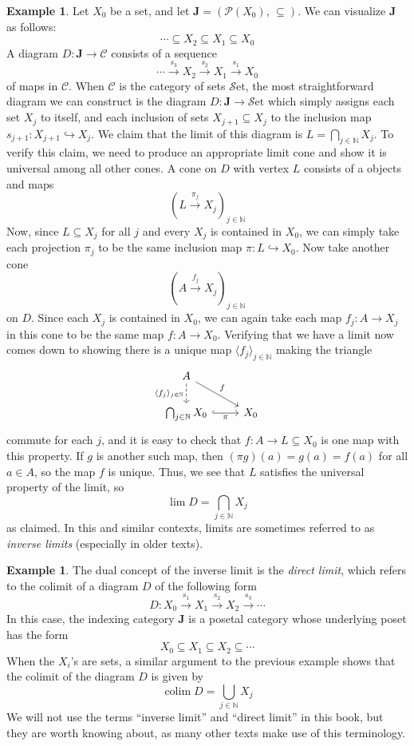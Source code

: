 \documentclass[10pt,oneside]{book}
\def\~#1{\mathscr{#1}}
\def\To#1{\xrightarrow{#1}}
\newcommand{\N}{\mathbb{N}}
\newcommand{\colim}{\mathop{\mathrm{colim}}}
\newcommand{\mono}{\hookrightarrow}
\newcommand{\Set}{\~S\mathrm{et}}
\theoremstyle{plain}
\theoremstyle{definition}
\newtheorem{ex}[thm]{Example}
\theoremstyle{remark}
\numberwithin{equation}{section}
\numberwithin{figure}{section}
\begin{document}
\begin{ex}
Let $X_0$ be a set, and let $\mathbf{J} = \left( \~P(X_0), \, \subseteq \right)$. We can visualize $\mathbf{J}$ as follows:
\[
\cdots \subseteq X_2 \subseteq X_1 \subseteq X_0
\]
A diagram $D: \mathbf{J} \to \~C$ consists of a sequence
\[\cdots \To{s_3} X_2 \To{s_2} X_1 \To{s_1} X_0\] 
of maps in $\~C$. When $\~C$ is the category of sets $\Set$, the most straightforward diagram we can construct is the diagram $D: \mathbf{J} \to \Set$ which simply assigns each set $X_j$ to itself, and each inclusion of sets $X_{j + 1} \subseteq X_{j}$ to the inclusion map $s_{j + 1}: X_{j + 1} \mono X_{j}$. We claim that the limit of this diagram is $L = \bigcap_{j \in \N} X_j$. To verify this claim, we need to produce an appropriate limit cone and show it is universal among all other cones. A cone on $D$ with vertex $L$ consists of a objects and maps 
\[\left(L \To{\pi_j} X_j\right)_{j \in \N}\]
Now, since $L\subseteq X_j$ for all $j$ and every $X_j$ is contained in $X_0$, we can simply take each projection $\pi_j$ to be the same inclusion map $\pi: L \mono X_0$. Now take another cone
\[\left(A \To{f_j} X_j \right)_{j \in \N}\] 
on $D$. Since each $X_j$ is contained in $X_0$, we can again take each map $f_j: A \to X_j$ in this cone to be the same map $f: A \to X_0$. Verifying that we have a limit now comes down to showing there is a unique map $\langle f_j \rangle_{j \in \N}$ making the triangle 
\[\begin{tikzcd}
    A \\
    {\bigcap_{j \in \N}X_0} & {X_0}
    \arrow["{\langle f_j \rangle_{j \in \N}}"', dashed, from=1-1, to=2-1]
    \arrow["\pi"', hook, from=2-1, to=2-2]
    \arrow["f", from=1-1, to=2-2]
\end{tikzcd}\]
commute for each $j$, and it is easy to check that $f: A \to L \subseteq X_0$ is one map with this property. If $g$ is another such map, then $(\pi g) (a) = g(a) = f(a)$ for all $a \in A$, so the map $f$ is unique. Thus, we see that $L$ satisfies the universal property of the limit, so 
\[\lim D = \bigcap_{j \in \N} X_j\]
as claimed. In this and similar contexts, limits are sometimes referred to as \emph{inverse limits} (especially in older texts).
\end{ex}

\begin{ex}
\label{ex:directlim}
The dual concept of the inverse limit is the \emph{direct limit}, which refers to the colimit of a diagram $D$ of the following form
\begin{equation}
D: X_0 \To{s_1} X_1 \To{s_2} X_2 \To{s_3} \cdots
\end{equation}
In this case, the indexing category $\mathbf{J}$ is a posetal category whose underlying poset has the form
\[X_0 \subseteq X_1 \subseteq X_2 \subseteq \cdots\]
When the $X_i$'s are sets, a similar argument to the previous example shows that the colimit of the diagram $D$ is given by    
\[\colim D = \bigcup_{j \in \N} X_j\] 
We will not use the terms ``inverse limit'' and ``direct limit'' in this book, but they are worth knowing about, as many other texts make use of this terminology.
\end{ex}
\end{document}
